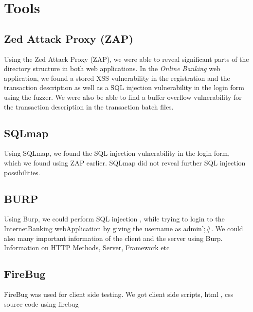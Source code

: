 \chapter{Tools}\label{chapter:tools}

\section{Zed Attack Proxy (ZAP)}
Using the Zed Attack Proxy (ZAP), we were able to reveal significant parts of the directory structure in both web applications. In the \textit{Online Banking} web application, we found a stored XSS vulnerability in the registration and the transaction description as well as a SQL injection vulnerability in the login form using the fuzzer. We were also be able to find a buffer overflow vulnerability for the transaction description in the transaction batch files.

\section{SQLmap}
Using SQLmap, we found the SQL injection vulnerability in the login form, which we found using ZAP earlier. SQLmap did not reveal further SQL injection possibilities.

\section{BURP}
Using Burp, we could perform SQL injection , while trying to login to the InternetBanking webApplication by giving the username as admin';#. We could also many important information of the client and the server using Burp. Information on HTTP Methods, Server, Framework etc

\section{FireBug}
FireBug was used for client side testing. We got client side scripts, html , css source code using firebug